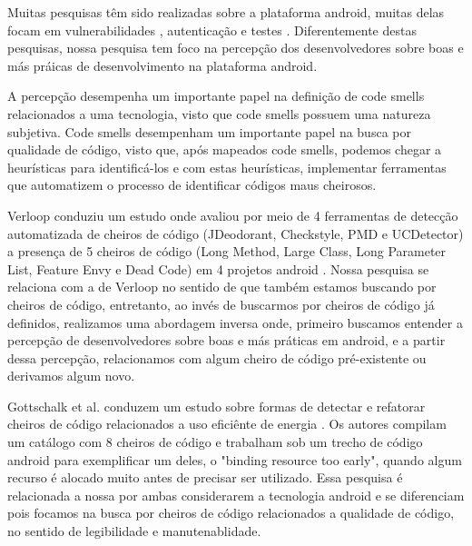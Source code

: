 Muitas pesquisas t\^em sido realizadas sobre a plataforma android, muitas delas focam em vulnerabilidades \cite{Y, F, G, X, P, D, E}, autentica\c{c}\~ao \cite{T, Yamashita6405287, R} e testes \cite{J, M}. Diferentemente destas pesquisas, nossa pesquisa tem foco na percep\c{c}\~ao dos desenvolvedores sobre boas e m\'as pr\'aicas de desenvolvimento na plataforma android. 

A percep\c{c}\~ao desempenha um importante papel na defini\c{c}\~ao de code smells relacionados a uma tecnologia, visto que code smells possuem uma natureza subjetiva. Code smells desempenham um importante papel na busca por qualidade de c\'odigo, visto que, ap\'os mapeados code smells, podemos chegar a heur\'isticas para identific\'a-los e com estas heur\'isticas, implementar ferramentas que automatizem o processo de identificar c\'odigos maus cheirosos.

Verloop conduziu um estudo onde avaliou por meio de 4 ferramentas de detec\c{c}\~ao automatizada de cheiros de c\'odigo (JDeodorant, Checkstyle, PMD e UCDetector) a presen\c{c}a de 5 cheiros de c\'odigo (Long Method, Large Class, Long Parameter List, Feature Envy e Dead Code) em 4 projetos android \cite{MobileSmells:13}. Nossa pesquisa se relaciona com a de Verloop no sentido de que tamb\'em estamos buscando por cheiros de c\'odigo, entretanto, ao inv\'es de buscarmos por cheiros de c\'odigo j\'a definidos, realizamos uma abordagem inversa onde, primeiro buscamos entender a percep\c{c}\~ao de desenvolvedores sobre boas e m\'as pr\'aticas em android, e a partir dessa percep\c{c}\~ao, relacionamos com algum cheiro de c\'odigo pr\'e-existente ou derivamos algum novo.


Gottschalk et al. conduzem um estudo sobre formas de detectar e refatorar cheiros de c\'odigo relacionados a uso efici\^ente de energia \cite{EnergyAndroidSmells}. Os autores compilam um cat\'alogo com 8 cheiros de c\'odigo e trabalham sob um trecho de c\'odigo android para exemplificar um deles, o "binding resource too early", quando algum recurso \'e alocado muito antes de precisar ser utilizado. Essa pesquisa \'e relacionada a nossa por ambas considerarem a tecnologia android e se diferenciam pois focamos na busca por cheiros de c\'odigo relacionados a qualidade de c\'odigo, no sentido de legibilidade e manutenablidade.

